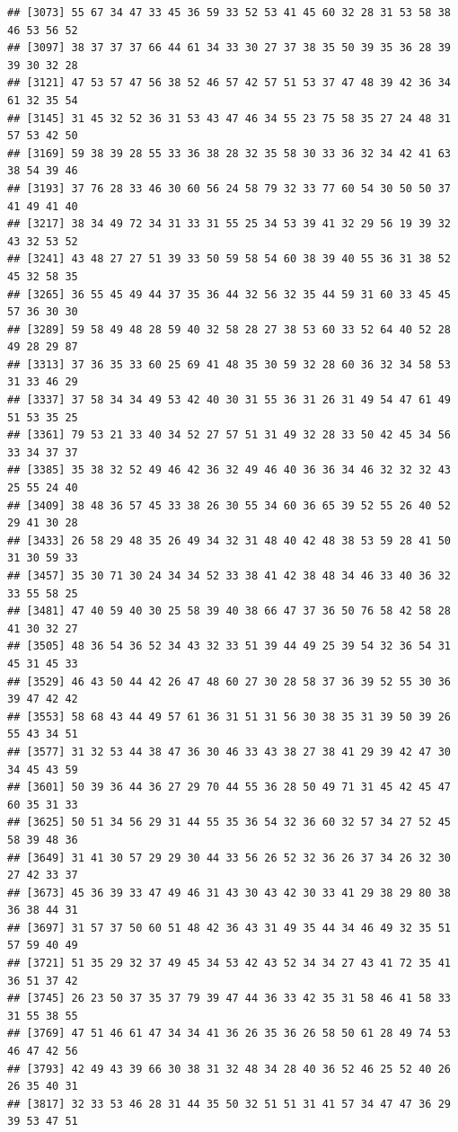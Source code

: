 \documentclass[
]{book}
\begin{document}
\begin{verbatim}
## [3073] 55 67 34 47 33 45 36 59 33 52 53 41 45 60 32 28 31 53 58 38 46 53 56 52
## [3097] 38 37 37 37 66 44 61 34 33 30 27 37 38 35 50 39 35 36 28 39 39 30 32 28
## [3121] 47 53 57 47 56 38 52 46 57 42 57 51 53 37 47 48 39 42 36 34 61 32 35 54
## [3145] 31 45 32 52 36 31 53 43 47 46 34 55 23 75 58 35 27 24 48 31 57 53 42 50
## [3169] 59 38 39 28 55 33 36 38 28 32 35 58 30 33 36 32 34 42 41 63 38 54 39 46
## [3193] 37 76 28 33 46 30 60 56 24 58 79 32 33 77 60 54 30 50 50 37 41 49 41 40
## [3217] 38 34 49 72 34 31 33 31 55 25 34 53 39 41 32 29 56 19 39 32 43 32 53 52
## [3241] 43 48 27 27 51 39 33 50 59 58 54 60 38 39 40 55 36 31 38 52 45 32 58 35
## [3265] 36 55 45 49 44 37 35 36 44 32 56 32 35 44 59 31 60 33 45 45 57 36 30 30
## [3289] 59 58 49 48 28 59 40 32 58 28 27 38 53 60 33 52 64 40 52 28 49 28 29 87
## [3313] 37 36 35 33 60 25 69 41 48 35 30 59 32 28 60 36 32 34 58 53 31 33 46 29
## [3337] 37 58 34 34 49 53 42 40 30 31 55 36 31 26 31 49 54 47 61 49 51 53 35 25
## [3361] 79 53 21 33 40 34 52 27 57 51 31 49 32 28 33 50 42 45 34 56 33 34 37 37
## [3385] 35 38 32 52 49 46 42 36 32 49 46 40 36 36 34 46 32 32 32 43 25 55 24 40
## [3409] 38 48 36 57 45 33 38 26 30 55 34 60 36 65 39 52 55 26 40 52 29 41 30 28
## [3433] 26 58 29 48 35 26 49 34 32 31 48 40 42 48 38 53 59 28 41 50 31 30 59 33
## [3457] 35 30 71 30 24 34 34 52 33 38 41 42 38 48 34 46 33 40 36 32 33 55 58 25
## [3481] 47 40 59 40 30 25 58 39 40 38 66 47 37 36 50 76 58 42 58 28 41 30 32 27
## [3505] 48 36 54 36 52 34 43 32 33 51 39 44 49 25 39 54 32 36 54 31 45 31 45 33
## [3529] 46 43 50 44 42 26 47 48 60 27 30 28 58 37 36 39 52 55 30 36 39 47 42 42
## [3553] 58 68 43 44 49 57 61 36 31 51 31 56 30 38 35 31 39 50 39 26 55 43 34 51
## [3577] 31 32 53 44 38 47 36 30 46 33 43 38 27 38 41 29 39 42 47 30 34 45 43 59
## [3601] 50 39 36 44 36 27 29 70 44 55 36 28 50 49 71 31 45 42 45 47 60 35 31 33
## [3625] 50 51 34 56 29 31 44 55 35 36 54 32 36 60 32 57 34 27 52 45 58 39 48 36
## [3649] 31 41 30 57 29 29 30 44 33 56 26 52 32 36 26 37 34 26 32 30 27 42 33 37
## [3673] 45 36 39 33 47 49 46 31 43 30 43 42 30 33 41 29 38 29 80 38 36 38 44 31
## [3697] 31 57 37 50 60 51 48 42 36 43 31 49 35 44 34 46 49 32 35 51 57 59 40 49
## [3721] 51 35 29 32 37 49 45 34 53 42 43 52 34 34 27 43 41 72 35 41 36 51 37 42
## [3745] 26 23 50 37 35 37 79 39 47 44 36 33 42 35 31 58 46 41 58 33 31 55 38 55
## [3769] 47 51 46 61 47 34 34 41 36 26 35 36 26 58 50 61 28 49 74 53 46 47 42 56
## [3793] 42 49 43 39 66 30 38 31 32 48 34 28 40 36 52 46 25 52 40 26 26 35 40 31
## [3817] 32 33 53 46 28 31 44 35 50 32 51 51 31 41 57 34 47 47 36 29 39 53 47 51

\end{verbatim}
\end{document}
